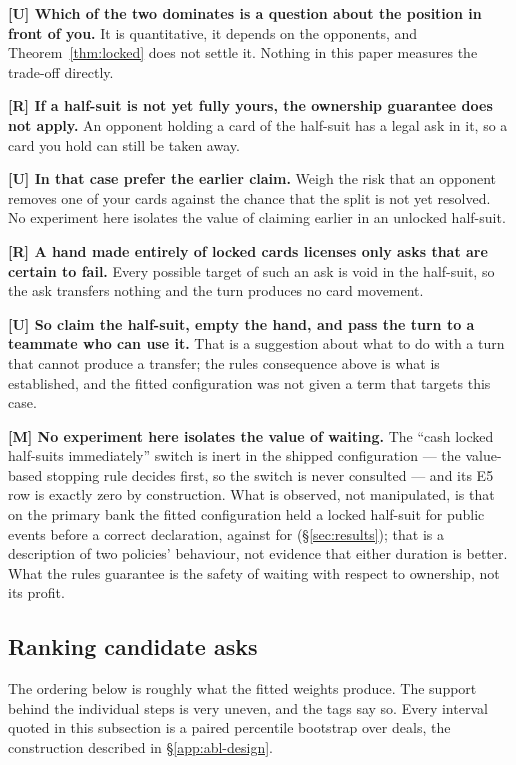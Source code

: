 \textbf{[U] Which of the two dominates is a question about the position in
front of you.} It is quantitative, it depends on the opponents, and
Theorem~\ref{thm:locked} does not settle it. Nothing in this paper measures the
trade-off directly.

\textbf{[R] If a half-suit is not yet fully yours, the ownership guarantee does
not apply.} An opponent holding a card of the half-suit has a legal ask in it,
so a card you hold can still be taken away.

\textbf{[U] In that case prefer the earlier claim.} Weigh the risk that an
opponent removes one of your cards against the chance that the split is not yet
resolved. No experiment here isolates the value of claiming earlier in an
unlocked half-suit.

\textbf{[R] A hand made entirely of locked cards licenses only asks that are
certain to fail.} Every possible target of such an ask is void in the half-suit,
so the ask transfers nothing and the turn produces no card movement.

\textbf{[U] So claim the half-suit, empty the hand, and pass the turn to a
teammate who can use it.} That is a suggestion about what to do with a turn
that cannot produce a transfer; the rules consequence above is what is
established, and the fitted configuration was not given a term that targets this
case.

\textbf{[M] No experiment here isolates the value of waiting.} The
``cash locked half-suits immediately'' switch is inert in the shipped
configuration --- the value-based stopping rule decides first, so the switch is
never consulted --- and its E5 row is exactly zero by construction. What is
observed, not manipulated, is that on the primary bank the fitted \vfast{}
configuration held a locked half-suit for \numLockHoldFour{} public events
before a correct declaration, against \numLockHoldThree{} for \vthree{}
(\S\ref{sec:results}); that is a description of two policies' behaviour, not
evidence that either duration is better. What the rules guarantee is the safety
of waiting with respect to ownership, not its profit.

\subsection{Ranking candidate asks}
\label{app:human-rank}

The ordering below is roughly what the fitted weights produce. The support
behind the individual steps is very uneven, and the tags say so. Every interval
quoted in this subsection is a paired percentile bootstrap over deals, the
construction described in \S\ref{app:abl-design}.

